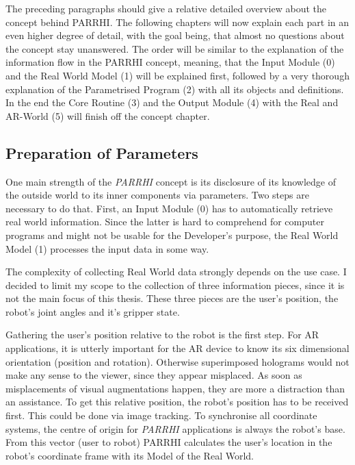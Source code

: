 The preceding paragraphs should give a relative detailed overview about the concept behind PARRHI. The following chapters will now explain each part in an even higher degree of detail, with the goal being, that almost no questions about the concept stay unanswered. The order will be similar to the explanation of the information flow in the PARRHI concept, meaning, that the Input Module (0) and the Real World Model (1) will be explained first, followed by a very thorough explanation of the Parametrised Program (2) with all its objects and definitions. In the end the Core Routine (3) and the Output Module (4) with the Real and AR-World (5) will finish off the concept chapter.


\subsection{Preparation of Parameters}
One main strength of the \textit{PARRHI} concept is its disclosure of its knowledge of the outside world to its inner components via parameters. Two steps are necessary to do that. First, an Input Module (0) has to automatically retrieve real world information. Since the latter is hard to comprehend for computer programs and might not be usable for the Developer's purpose, the Real World Model (1) processes the input data in some way. 

The complexity of collecting Real World data strongly depends on the use case. I decided to limit my scope to the collection of three information pieces, since it is not the main focus of this thesis. These three pieces are the user's position, the robot's joint angles and it's gripper state. 

Gathering the user's position relative to the robot is the first step. For AR applications, it is utterly important for the AR device to know its six dimensional orientation (position and rotation). Otherwise superimposed holograms would not make any sense to the viewer, since they appear misplaced. As soon as misplacements of visual augmentations happen, they are more a distraction than an assistance. To get this relative position, the robot's position has to be received first. This could be done via image tracking. To synchronise all coordinate systems, the centre of origin for \textit{PARRHI} applications is always the robot's base. From this vector (user to robot) PARRHI calculates the user's location in the robot's coordinate frame with its Model of the Real World.

